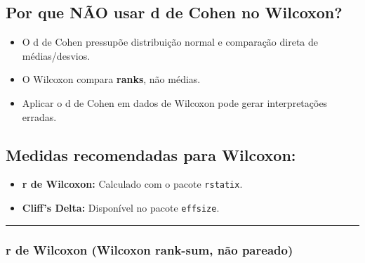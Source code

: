 \documentclass[
]{book}
\newenvironment{Shaded}{\begin{snugshade}}{\end{snugshade}}
\newcommand{\CommentTok}[1]{\textcolor[rgb]{0.56,0.35,0.01}{\textit{#1}}}
\newcommand{\FunctionTok}[1]{\textcolor[rgb]{0.13,0.29,0.53}{\textbf{#1}}}
\newcommand{\NormalTok}[1]{#1}
\newcommand{\OtherTok}[1]{\textcolor[rgb]{0.56,0.35,0.01}{#1}}
\newcommand{\SpecialCharTok}[1]{\textcolor[rgb]{0.81,0.36,0.00}{\textbf{#1}}}
\newcommand{\StringTok}[1]{\textcolor[rgb]{0.31,0.60,0.02}{#1}}
\providecommand{\tightlist}{%
  \setlength{\itemsep}{0pt}\setlength{\parskip}{0pt}}
\begin{document}
\subsection{Por que NÃO usar d de Cohen no Wilcoxon?}\label{por-que-nuxe3o-usar-d-de-cohen-no-wilcoxon}

\begin{itemize}
\tightlist
\item
  O d de Cohen pressupõe distribuição normal e comparação direta de médias/desvios.
\item
  O Wilcoxon compara \textbf{ranks}, não médias.
\item
  Aplicar o d de Cohen em dados de Wilcoxon pode gerar interpretações erradas.
\end{itemize}

\subsection{Medidas recomendadas para Wilcoxon:}\label{medidas-recomendadas-para-wilcoxon}

\begin{itemize}
\tightlist
\item
  \textbf{r de Wilcoxon:} Calculado com o pacote \texttt{rstatix}.
\item
  \textbf{Cliff's Delta:} Disponível no pacote \texttt{effsize}.
\end{itemize}

\begin{center}\rule{0.5\linewidth}{0.5pt}\end{center}

\subsubsection{r de Wilcoxon (Wilcoxon rank-sum, não pareado)}\label{r-de-wilcoxon-wilcoxon-rank-sum-nuxe3o-pareado}

\begin{Shaded}
\end{Shaded}
\end{document}
